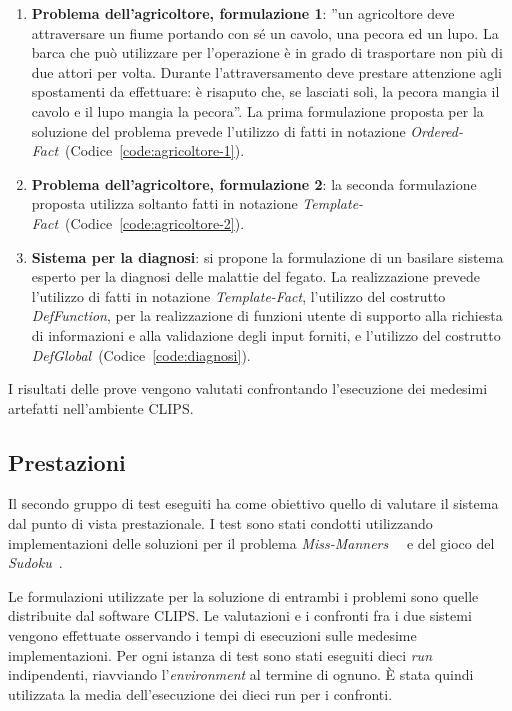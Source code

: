 \begin{enumerate}
	\item \textbf{Problema dell'agricoltore, formulazione 1}: ''un agricoltore deve attraversare un fiume portando con sé un cavolo, una pecora ed un lupo. La barca che può utilizzare per l'operazione è in grado di trasportare non più di due attori per volta. Durante l'attraversamento deve prestare attenzione agli spostamenti da effettuare: è risaputo che, se lasciati soli, la pecora mangia il cavolo e il lupo mangia la pecora''. La prima formulazione proposta per la soluzione del problema prevede l'utilizzo di fatti in notazione \emph{Ordered-Fact}~(Codice~\ref{code:agricoltore-1}).
	
	\item \textbf{Problema dell'agricoltore, formulazione 2}: la seconda formulazione proposta utilizza soltanto fatti in notazione \emph{Template-Fact}~(Codice~\ref{code:agricoltore-2}).

	\item \textbf{Sistema per la diagnosi}: si propone la formulazione di un basilare sistema esperto per la diagnosi delle malattie del fegato. La realizzazione prevede l'utilizzo di fatti in notazione \emph{Template-Fact}, l'utilizzo del costrutto \emph{DefFunction}, per la realizzazione di funzioni utente di supporto alla richiesta di informazioni e alla validazione degli input forniti, e l'utilizzo del costrutto \emph{DefGlobal}~(Codice~\ref{code:diagnosi}).

\end{enumerate}

I risultati delle prove vengono valutati confrontando l'esecuzione dei medesimi artefatti nell'ambiente CLIPS.

\subsection{Prestazioni}

Il secondo gruppo di test eseguiti ha come obiettivo quello di valutare il sistema dal punto di vista prestazionale. I test sono stati condotti utilizzando implementazioni delle soluzioni per il problema \emph{Miss-Manners}~\cite{brantetal91}~\cite{ops5bench} e del gioco del \emph{Sudoku}~\cite{clipssudoku}.

Le formulazioni utilizzate per la soluzione di entrambi i problemi sono quelle distribuite dal software CLIPS. Le valutazioni e i confronti fra i due sistemi vengono effettuate osservando i tempi di esecuzioni sulle medesime implementazioni. Per ogni istanza di test sono stati eseguiti dieci \emph{run} indipendenti, riavviando l'\emph{environment} al termine di ognuno. \`E stata quindi utilizzata la media dell'esecuzione dei dieci run per i confronti.


